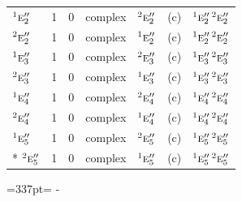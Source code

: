 \documentclass[10pt,a4paper]{article}
\newcommand{\needspace}[1]{\par\penalty-100\begingroup\dimen0=#1\relax\dimen2=\pagegoal
  \advance\dimen2-\pagetotal\ifdim\dimen0>\dimen2\relax\ifdim\dimen2>0pt\vfil\break\fi\fi
  \endgroup}
\numberwithin{equation}{section}
\newcommand{\irr}[1]{\text{\normalfont\scshape #1}}
\newcommand{\conjpair}[1]{{}^{#1}}
\begin{document}
{\begin{longtable}{@{}lrrllll@{}}
$\conjpair{1}\irr{e}_{2}''$ & 1 & $0$ & complex & $\conjpair{2}\irr{e}_{2}''$ & (c) & $\conjpair{1}\irr{e}_{2}''\,\conjpair{2}\irr{e}_{2}''$\\
$\conjpair{2}\irr{e}_{2}''$ & 1 & $0$ & complex & $\conjpair{1}\irr{e}_{2}''$ & (c) & $\conjpair{1}\irr{e}_{2}''\,\conjpair{2}\irr{e}_{2}''$\\
$\conjpair{1}\irr{e}_{3}''$ & 1 & $0$ & complex & $\conjpair{2}\irr{e}_{3}''$ & (c) & $\conjpair{1}\irr{e}_{3}''\,\conjpair{2}\irr{e}_{3}''$\\
$\conjpair{2}\irr{e}_{3}''$ & 1 & $0$ & complex & $\conjpair{1}\irr{e}_{3}''$ & (c) & $\conjpair{1}\irr{e}_{3}''\,\conjpair{2}\irr{e}_{3}''$\\
$\conjpair{1}\irr{e}_{4}''$ & 1 & $0$ & complex & $\conjpair{2}\irr{e}_{4}''$ & (c) & $\conjpair{1}\irr{e}_{4}''\,\conjpair{2}\irr{e}_{4}''$\\
$\conjpair{2}\irr{e}_{4}''$ & 1 & $0$ & complex & $\conjpair{1}\irr{e}_{4}''$ & (c) & $\conjpair{1}\irr{e}_{4}''\,\conjpair{2}\irr{e}_{4}''$\\
$\conjpair{1}\irr{e}_{5}''$ & 1 & $0$ & complex & $\conjpair{2}\irr{e}_{5}''$ & (c) & $\conjpair{1}\irr{e}_{5}''\,\conjpair{2}\irr{e}_{5}''$\\*
$\conjpair{2}\irr{e}_{5}''$ & 1 & $0$ & complex & $\conjpair{1}\irr{e}_{5}''$ & (c) & $\conjpair{1}\irr{e}_{5}''\,\conjpair{2}\irr{e}_{5}''$\\
\bottomrule\end{longtable}}
\needspace{337pt}
\end{document}
